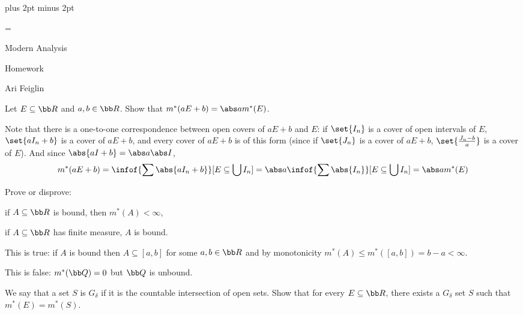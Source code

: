 

\parindent=0pt
\parskip=3pt plus 2pt minus 2pt



\footline={}

\setcounter{section}{1}


\def\printmcount{\the\counter{section}.\the\counter{math counter}}

{

    \centerline{Modern Analysis}
    \smallskip
    \centerline{Homework \the{}}
    \centerline{Ari Feiglin}

\eppbox}

\bexerc

    Let $E\subseteq{\bb R}$ and $a,b\in{\bb R}$.
    Show that $m^*(aE+b)=\abs a m^*(E)$.

\eexerc

Note that there is a one-to-one correspondence between open covers of $aE+b$ and $E$: if $\set{I_n}$ is a cover of open intervals of $E$, $\set{aI_n+b}$ is a cover of $aE+b$, and every cover of $aE+b$ is
of this form (since if $\set{J_n}$ is a cover of $aE+b$, $\set{\frac{J_n-b}a}$ is a cover of $E$).
And since $\abs{aI+b}=\abs a\abs I$,
$$ m^*(aE+b) = \infof{\sum\abs{aI_n+b}}[E\subseteq\bigcup I_n]  = \abs a\infof{\sum\abs{I_n}}[E\subseteq\bigcup I_n] = \abs a m^*(E) $$

\bexerc

    Prove or disprove:
    \benum
        \item if $A\subseteq{\bb R}$ is bound, then $m^*(A)<\infty$,
        \item if $A\subseteq{\bb R}$ has finite measure, $A$ is bound.
    \eenum

\eexerc

\benum
    \item This is true: if $A$ is bound then $A\subseteq[a,b]$ for some $a,b\in{\bb R}$ and by monotonicity $m^*(A)\leq m^*([a,b])=b-a<\infty$.
    \item This is false: $m^*({\bb Q})=0$ but ${\bb Q}$ is unbound.
\eenum

\bexerc

    We say that a set $S$ is $G_\delta$ if it is the countable intersection of open sets.
    Show that for every $E\subseteq{\bb R}$, there exists a $G_\delta$ set $S$ such that $m^*(E)=m^*(S)$.

